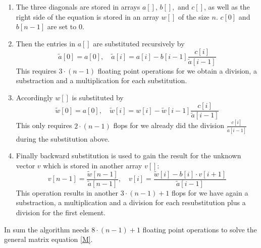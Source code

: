 \documentclass[11pt,a4wide]{article}
\begin{document}
\begin{enumerate}
	\item  The three diagonals are stored in arrays $a[],\,b[],$ and $c[]$, as well as the right side of the equation is stored in an array $w[]$ of the size $n$. $c[0]$ and $b[n-1]$ are set to 0.
	\item	Then the entries in $a[]$ are substituted recursively by
	\begin{equation}
	\tilde{a}[0]=a[0],\quad \tilde{a}[i]=a[i]-b[i-1]\dfrac{c[i]}{\tilde{a}[i-1]}
	\label{eq:3}
	\end{equation}
	This requires $3\cdot (n-1)$ floating point operations for we obtain a division, a substraction and a multiplication for each substitution.
	\item Accordingly $w[]$ is substituted by
		\begin{equation}
	\tilde{w}[0]=a[0],\quad \tilde{w}[i]=w[i]-\tilde{w}[i-1]\dfrac{c[i]}{\tilde{a}[i-1]}
	\label{eq:4}
	\end{equation}
	This only requires $2\cdot (n-1)$ flops for we already did the division $\frac{c[i]}{\tilde{a}[i-1]}$ during the substitution above.
	\item Finally backward substitution is used to gain the result for the unknown vector $v$ which is stored in another array $v[]$:
		\begin{equation}
	v[n-1]=\dfrac{\tilde{w}[n-1]}{\tilde{a}[n-1]},\quad v[i]=\dfrac{\tilde{w}[i]-b[i]\cdot v[i+1]}{\tilde{a}[i-1]}
	\label{eq:5}
	\end{equation}
	This operation results in another $3\cdot(n-1)+1$ flops for we have again a substraction, a multiplication and a division for each resubstitution plus a division for the first element.
\end{enumerate}
In sum the algorithm needs $8\cdot(n-1)+1$ floating point operations to solve the general matrix equation \ref{M}. 
\end{document}
